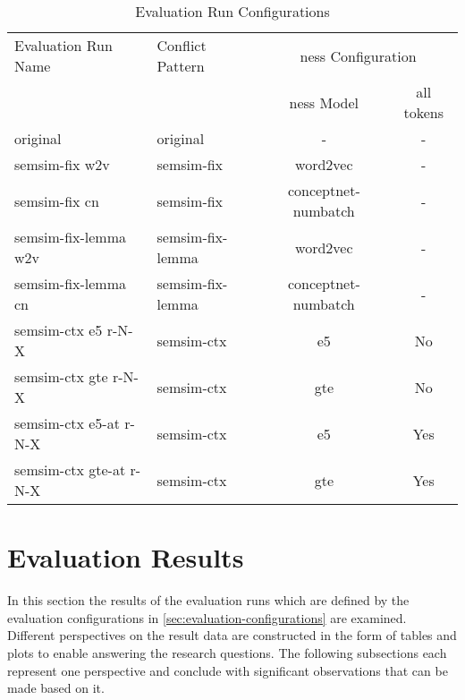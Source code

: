 \documentclass[11pt]{scrreprt}
\begin{document}
{\begin{table}
\centering
\begin{tabular}{llcc}
\toprule
\multicolumn{1}{l}{Evaluation Run Name} & \multicolumn{1}{l}{Conflict Pattern} & \multicolumn{2}{c}{\gls{ness} Configuration} \\
\cmidrule{3-4}
\multicolumn{1}{l}{}   & \multicolumn{1}{l}{}  & \multicolumn{1}{c}{\gls{ness} Model}	& \multicolumn{1}{c}{all tokens} \\
\midrule
original                       & original                     & -                          & -                \\
semsim-fix w2v                 & semsim-fix                   & word2vec                   & -                \\
semsim-fix cn                 & semsim-fix                   & conceptnet-numbatch                      & -      \\
semsim-fix-lemma w2v           & semsim-fix-lemma             & word2vec                   & -                \\
semsim-fix-lemma cn           & semsim-fix-lemma             & conceptnet-numbatch                      & -      \\
semsim-ctx e5 r-N-X                & semsim-ctx                   & e5                         & No           \\
semsim-ctx gte r-N-X              & semsim-ctx                   & gte                        & No            \\
semsim-ctx e5-at r-N-X             & semsim-ctx                   & e5                         & Yes          \\
semsim-ctx gte-at r-N-X           & semsim-ctx                   & gte                        & Yes           \\
\end{tabular}
\caption{Evaluation Run Configurations}
\label{tab:evaluation-run-configs}
\end{table}


\section{Evaluation Results}
\label{sec:evaluation-results}
In this section the results of the evaluation runs which are defined by the evaluation configurations in \cref{sec:evaluation-configurations} are examined. Different perspectives on the result data are constructed in the form of tables and plots to enable answering the research questions. The following subsections each represent one perspective and conclude with significant observations that can be made based on it.

}
\end{document}
